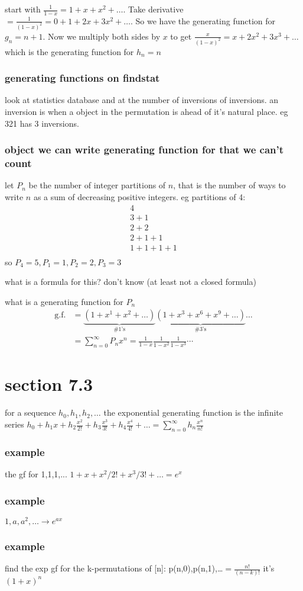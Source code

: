 \documentclass{article}
\begin{document}
start with $\frac{1}{1-x}=1+x+x^2+\dots$. Take derivative$=\frac{1}{(1-x)^2}=0+1+2x+3x^2+\dots$. So we have the generating function for $g_n=n+1$. Now we multiply both sides by $x$ to get $\frac{x}{(1-x)^2}=x+2x^2+3x^3+\dots$ which is the generating function for $h_n=n$

\subsubsection*{generating functions on findstat}
look at statistics database and at the number of inversions of inversions. an inversion is when a object in the permutation is ahead of it's natural place. eg 321 has 3 inversions. 

\subsubsection*{object we can write generating function for that we can't count}
let $P_n$ be the number of integer partitions of $n$, that is the number of ways to write $n$ as a sum of decreasing positive integers. eg partitions of 4:
\begin{align*}
  4\\
  3+1\\
  2+2\\
  2+1+1\\
  1+1+1+1\\
\end{align*}
so $P_4=5, P_1=1, P_2=2,P_3=3$

what is a formula for this? don't know (at least not a closed formula)

what is a generating function for $P_n$
\begin{align*}
  \text{g.f.}&=
  \underbrace{(1+x^1+x^2+\dots)}_{\text{\#1's}}
  \underbrace{(1+x^3+x^6+x^9+\dots)}_{\text{\#3's}}\dots\\
  &=\sum\limits_{n=0}^\infty{P_nx^n}=\frac{1}{1-x}\frac{1}{1-x^2}\frac{1}{1-x^3}\cdots
\end{align*}
\section*{section 7.3}
for a sequence $h_0,h_1,h_2,\dots$ the exponential generating function is the infinite series $h_0+h_1x+h_2\frac{x^2}{2!}+h_3\frac{x^3}{3!}+h_4\frac{x^4}{4!}+\dots=\sum\limits_{n=0}^{\infty}{h_n\frac{x^n}{n!}}$

\subsubsection*{example}
the gf for 1,1,1,... $1+x+x^2/2!+x^3/3!+\dots=e^x$

\subsubsection*{example}
$1,a,a^2,\dots\to e^{ax}$
\subsubsection*{example}
find the exp gf for the k-permutations of [n]: p(n,0),p(n,1),\dots$=\frac{n!}{(n-k)!}$
it's $(1+x)^n$
\end{document}
